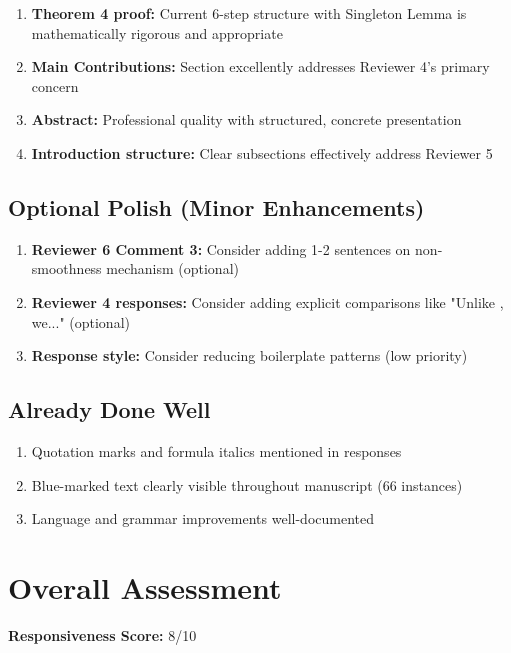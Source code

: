 \documentclass[11pt]{article}
\begin{document}
\begin{enumerate}
\item \textcolor{success}{\textbf{Theorem 4 proof:}} Current 6-step structure with Singleton Lemma is mathematically rigorous and appropriate
\item \textcolor{success}{\textbf{Main Contributions:}} Section excellently addresses Reviewer 4's primary concern
\item \textcolor{success}{\textbf{Abstract:}} Professional quality with structured, concrete presentation
\item \textcolor{success}{\textbf{Introduction structure:}} Clear subsections effectively address Reviewer 5
\end{enumerate}

\subsection{Optional Polish (Minor Enhancements)}

\begin{enumerate}
\item \textcolor{warning}{\textbf{Reviewer 6 Comment 3:}} Consider adding 1-2 sentences on non-smoothness mechanism (optional)
\item \textcolor{warning}{\textbf{Reviewer 4 responses:}} Consider adding explicit comparisons like "Unlike \cite{X}, we..." (optional)
\item \textbf{Response style:} Consider reducing boilerplate patterns (low priority)
\end{enumerate}

\subsection{Already Done Well}

\begin{enumerate}
\item Quotation marks and formula italics mentioned in responses
\item Blue-marked text clearly visible throughout manuscript (66 instances)
\item Language and grammar improvements well-documented
\end{enumerate}

\section{Overall Assessment}

\textbf{Responsiveness Score:} 8/10
\end{document}
